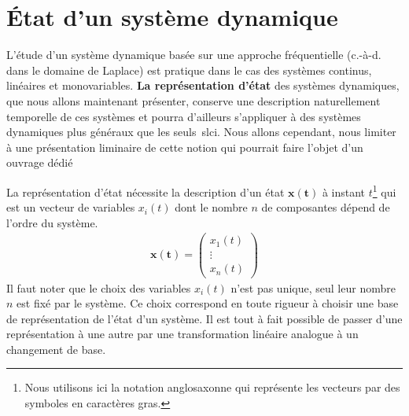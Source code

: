 \section{\'Etat d'un système dynamique}
\newcommand{\bdx}{\boldsymbol{x}}
\newcommand{\bds}{\boldsymbol{s}}
\newcommand{\bde}{\boldsymbol{e}}
\newcommand{\bdt}{\boldsymbol{(t)}}
\newcommand{\bdxt}{\bdx\bdt}
\newcommand{\bdst}{\bds\bdt}
\newcommand{\bdet}{\bde\bdt}
L'étude d'un système dynamique basée sur une approche fréquentielle (c.-à-d. 
dans le domaine de Laplace) est pratique dans le cas des systèmes continus, 
linéaires et monovariables. \textbf{La représentation d'état} des systèmes 
dynamiques, que nous allons maintenant présenter, conserve une description 
naturellement temporelle de ces systèmes et pourra d'ailleurs s'appliquer 
à des systèmes dynamiques plus généraux que les seuls~\gls{slci}. 
Nous allons cependant, nous limiter à une présentation
liminaire de cette notion qui pourrait faire l'objet d'un ouvrage dédié

La représentation d'état nécessite la description d'un état 
$\bdxt$ à instant $t$\footnote{Nous utilisons ici la notation anglosaxonne qui
représente les vecteurs par des symboles en caractères gras.} qui est un 
vecteur de variables $x_i(t)$ dont le nombre $n$ de composantes dépend 
de l'ordre du système.
\begin{align*}
    \bdxt = \begin{pmatrix}
            x_1(t)\\
            \vdots\\
             x_n(t)
            \end{pmatrix}
\end{align*}
Il faut noter que le choix des variables $x_i(t)$ n'est pas unique, seul leur
nombre $n$ est fixé par le système. Ce choix correspond en toute rigueur
à choisir une base de représentation de l'état d'un système. Il est tout à 
fait possible de passer d'une représentation à une autre par une transformation
linéaire analogue à un changement de base.


